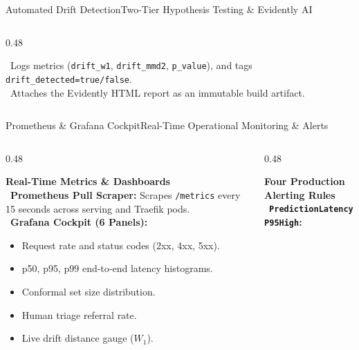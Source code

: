 \documentclass[aspectratio=169,10pt]{beamer}
\begin{document}
\begin{frame}{Automated Drift Detection}{Two-Tier Hypothesis Testing \& Evidently AI}
\begin{columns}[T]
\begin{column}{0.48\textwidth}
\begin{greencard}
                \textbullet\ Logs metrics (\texttt{drift\_w1}, \texttt{drift\_mmd2}, \texttt{p\_value}), and tags \texttt{drift\_detected=true/false}.\\[3pt]
                \textbullet\ Attaches the Evidently HTML report as an immutable build artifact.
            \end{greencard}
        \end{column}
    \end{columns}
\end{frame}

\begin{frame}{Prometheus \& Grafana Cockpit}{Real-Time Operational Monitoring \& Alerts}
    \begin{columns}[T]
        \begin{column}{0.48\textwidth}
            \begin{ambercard}
                \textbf{\color{AmberAccent} Real-Time Metrics \& Dashboards}\\[2pt]
                \textbullet\ \textbf{Prometheus Pull Scraper:} Scrapes \texttt{/metrics} every 15 seconds across serving and Traefik pods.\\[2pt]
                \textbullet\ \textbf{Grafana Cockpit (6 Panels):}
                \begin{itemize}\scriptsize
                    \item Request rate and status codes (2xx, 4xx, 5xx).
                    \item p50, p95, p99 end-to-end latency histograms.
                    \item Conformal set size distribution.
                    \item Human triage referral rate.
                    \item Live drift distance gauge ($W_1$).
                \end{itemize}
            \end{ambercard}
        \end{column}
        \begin{column}{0.48\textwidth}
            \begin{rosecard}
                \textbf{\color{RoseAccent} Four Production Alerting Rules}\\[2pt]
                \textbullet\ \textbf{\texttt{PredictionLatencyP95High}:}\\

\end{rosecard}
\end{column}
\end{columns}
\end{frame}
\end{document}
